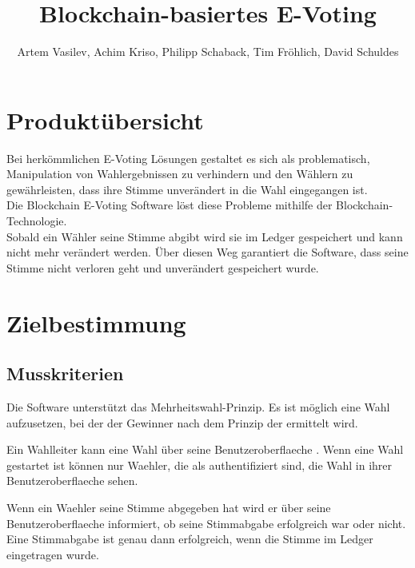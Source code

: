 \documentclass[parskip=full,11pt,twoside]{scrartcl}
\title{Blockchain-basiertes E-Voting}
\author{Artem Vasilev, Achim Kriso, Philipp Schaback, Tim Fröhlich, David Schuldes}
\begin{document}
\maketitle

\pagebreak

\tableofcontents
\pagebreak
\section{Produktübersicht}

Bei herkömmlichen E-Voting Lösungen gestaltet es sich als problematisch, Manipulation von Wahlergebnissen zu verhindern und den Wählern zu gewährleisten, dass ihre Stimme unverändert in die Wahl eingegangen ist. \\
Die Blockchain E-Voting Software löst diese Probleme mithilfe der Blockchain-Technologie. \\
Sobald ein Wähler seine Stimme abgibt wird sie im \gls{Ledger} gespeichert und kann nicht mehr verändert werden. Über diesen Weg garantiert die Software, dass seine Stimme nicht verloren geht und unverändert gespeichert wurde.

\section{Zielbestimmung}

\subsection{Musskriterien}

Die Software unterstützt das Mehrheitswahl-Prinzip. Es ist möglich eine Wahl aufzusetzen, bei der der Gewinner nach dem Prinzip der 
 ermittelt wird.

Ein \gls{Wahlleiter} kann eine \gls{Wahl} über seine \gls{Benutzeroberflaeche} .
Wenn eine \gls{Wahl} gestartet ist können nur \gls{Waehler}, die als  authentifiziert sind, die \gls{Wahl} in ihrer \gls{Benutzeroberflaeche} sehen.

Wenn ein \gls{Waehler} seine \gls{Stimme} abgegeben hat wird er über seine \gls{Benutzeroberflaeche} informiert, ob seine \gls{Stimmabgabe} erfolgreich war oder nicht. Eine \gls{Stimmabgabe} ist genau dann erfolgreich, wenn die \gls{Stimme} im \gls{Ledger} eingetragen wurde.
\end{document}
